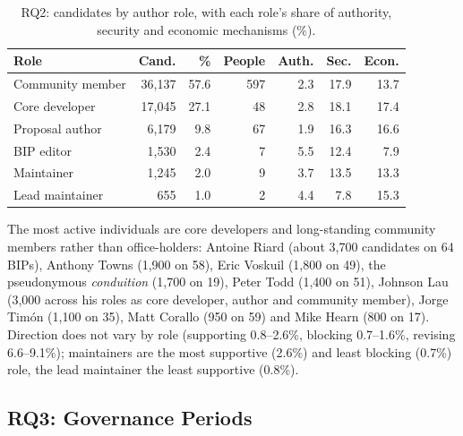 \begin{table}[t]
\caption{RQ2: candidates by author role, with each role's share of authority, security and economic mechanisms (\%).}
\label{tab:roles}
\small
\setlength{\tabcolsep}{4pt}
\begin{tabular}{lrrrrrr}
\toprule
Role & Cand. & \% & People & Auth. & Sec. & Econ. \\
\midrule
Community member & 36,137 & 57.6 & 597 & 2.3 & 17.9 & 13.7 \\
Core developer & 17,045 & 27.1 & 48 & 2.8 & 18.1 & 17.4 \\
Proposal author & 6,179 & 9.8 & 67 & 1.9 & 16.3 & 16.6 \\
BIP editor & 1,530 & 2.4 & 7 & 5.5 & 12.4 & 7.9 \\
Maintainer & 1,245 & 2.0 & 9 & 3.7 & 13.5 & 13.3 \\
Lead maintainer & 655 & 1.0 & 2 & 4.4 & 7.8 & 15.3 \\
\bottomrule
\end{tabular}
\end{table}

The most active individuals are core developers and long-standing community members rather than office-holders: Antoine Riard (about 3,700 candidates on 64 BIPs), Anthony Towns (1,900 on 58), Eric Voskuil (1,800 on 49), the pseudonymous \emph{conduition} (1,700 on 19), Peter Todd (1,400 on 51), Johnson Lau (3,000 across his roles as core developer, author and community member), Jorge Tim\'on (1,100 on 35), Matt Corallo (950 on 59) and Mike Hearn (800 on 17). Direction does not vary by role (supporting 0.8--2.6\%, blocking 0.7--1.6\%, revising 6.6--9.1\%); maintainers are the most supportive (2.6\%) and least blocking (0.7\%) role, the lead maintainer the least supportive (0.8\%).

\subsection{RQ3: Governance Periods}

